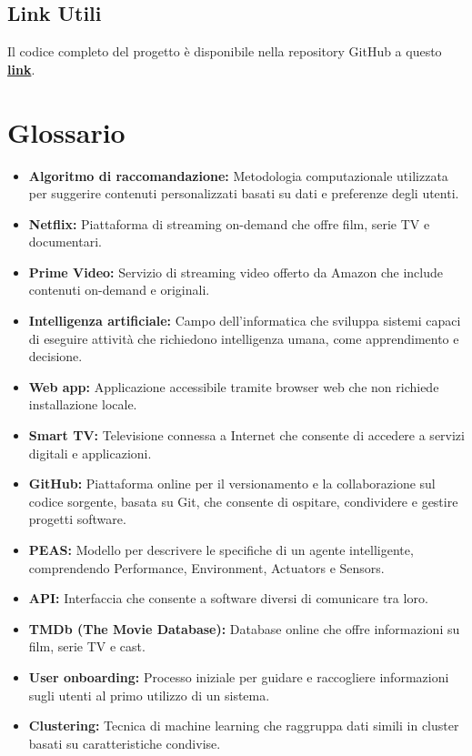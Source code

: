 \documentclass[a4paper,12pt]{article}
\begin{document}
	\subsection{Link Utili}
Il codice completo del progetto è disponibile nella repository GitHub a questo \textcolor{blue}{\href{https://github.com/LRuocco22/NozApp/}{\textbf{{link}}}}.

\section{Glossario}
\begin{itemize}
\item \textbf{Algoritmo di raccomandazione:} Metodologia computazionale utilizzata per suggerire contenuti personalizzati basati su dati e preferenze degli utenti.
\item \textbf{Netflix:} Piattaforma di streaming on-demand che offre film, serie TV e documentari.
\item \textbf{Prime Video:} Servizio di streaming video offerto da Amazon che include contenuti on-demand e originali.
\item \textbf{Intelligenza artificiale:} Campo dell'informatica che sviluppa sistemi capaci di eseguire attività che richiedono intelligenza umana, come apprendimento e decisione.
\item \textbf{Web app:} Applicazione accessibile tramite browser web che non richiede installazione locale.
\item \textbf{Smart TV:} Televisione connessa a Internet che consente di accedere a servizi digitali e applicazioni.
\item \textbf{GitHub:} Piattaforma online per il versionamento e la collaborazione sul codice sorgente, basata su Git, che consente di ospitare, condividere e gestire progetti software.
\item \textbf{PEAS:} Modello per descrivere le specifiche di un agente intelligente, comprendendo Performance, Environment, Actuators e Sensors.
\item \textbf{API:} Interfaccia che consente a software diversi di comunicare tra loro.
\item \textbf{TMDb (The Movie Database):} Database online che offre informazioni su film, serie TV e cast.
\item \textbf{User onboarding:} Processo iniziale per guidare e raccogliere informazioni sugli utenti al primo utilizzo di un sistema.
\item \textbf{Clustering:} Tecnica di machine learning che raggruppa dati simili in cluster basati su caratteristiche condivise.

\end{itemize}
\end{document}
